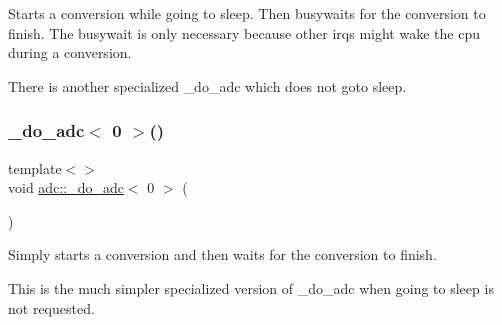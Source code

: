 Starts a conversion while going to sleep. Then busywaits for the conversion to finish. The busywait is only necessary because other irqs might wake the cpu during a conversion. 

There is another specialized \+\_\+do\+\_\+adc which does not goto sleep. \hypertarget{namespaceadc_a6e0b185b550424440d92bc2b129f6128}{}\label{namespaceadc_a6e0b185b550424440d92bc2b129f6128} 
\subsubsection{\texorpdfstring{\+\_\+do\+\_\+adc$<$ 0 $>$()}{\_do\_adc< 0 >()}}
{\footnotesize\ttfamily template$<$$>$ \\
void \hyperlink{namespaceadc_ab569dff590b3bb745fb012aa29ec5723}{adc\+::\+\_\+do\+\_\+adc}$<$ 0 $>$ (\begin{DoxyParamCaption}{ }\end{DoxyParamCaption})}



Simply starts a conversion and then waits for the conversion to finish. 

This is the much simpler specialized version of \+\_\+do\+\_\+adc when going to sleep is not requested. 